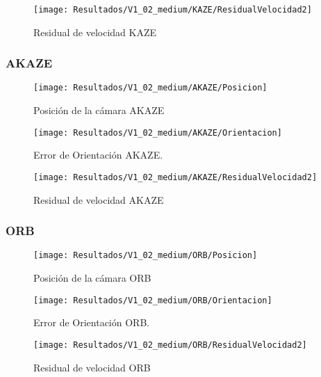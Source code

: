 \begin{figure}[H]
	\centering
	\texttt{[image: Resultados/V1\_02\_medium/KAZE/ResidualVelocidad2]}
	\caption{Residual de velocidad KAZE}
	\label{imagen:Resultados/V1_02_medium/KAZE/ResidualVelocidad}
\end{figure}



\subsubsection{AKAZE}


\begin{figure}[H]
	\centering
	\texttt{[image: Resultados/V1\_02\_medium/AKAZE/Posicion]}
	\caption{Posición de la cámara AKAZE}
	\label{imagen:Resultados/V1_02_medium/AKAZE/Posicion}
\end{figure}


\begin{figure}[H]
	\centering
	\texttt{[image: Resultados/V1\_02\_medium/AKAZE/Orientacion]}
	\caption[Error de Orientación AKAZE]{Error de Orientación AKAZE.}
	\label{imagen:Resultados/V1_02_medium/AKAZE/Orientacion}
\end{figure}



\begin{figure}[H]
	\centering
	\texttt{[image: Resultados/V1\_02\_medium/AKAZE/ResidualVelocidad2]}
	\caption{Residual de velocidad AKAZE}
	\label{imagen:Resultados/V1_02_medium/AKAZE/ResidualVelocidad}
\end{figure}

\subsubsection{ORB}


\begin{figure}[H]
	\centering
	\texttt{[image: Resultados/V1\_02\_medium/ORB/Posicion]}
	\caption{Posición de la cámara ORB}
	\label{imagen:Resultados/V1_02_medium/ORB/Posicion}
\end{figure}


\begin{figure}[H]
	\centering
	\texttt{[image: Resultados/V1\_02\_medium/ORB/Orientacion]}
	\caption[Error de Orientación ORB]{Error de Orientación ORB.}
	\label{imagen:Resultados/V1_02_medium/ORB/Orientacion}
\end{figure}
\begin{figure}[H]
	\centering
	\texttt{[image: Resultados/V1\_02\_medium/ORB/ResidualVelocidad2]}
	\caption{Residual de velocidad ORB}
	\label{imagen:Resultados/V1_02_medium/ORB/ResidualVelocidad}
\end{figure}


